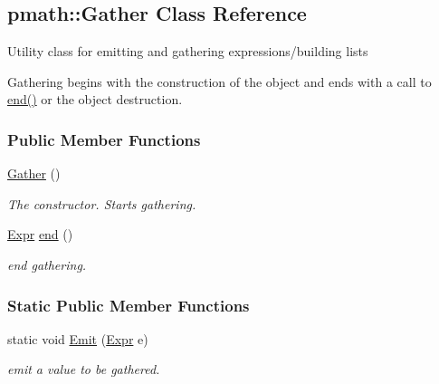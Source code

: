 \hypertarget{classpmath_1_1_gather}{
\subsection{pmath::Gather Class Reference}
\label{classpmath_1_1_gather}
}
Utility class for emitting and gathering expressions/building lists

Gathering begins with the construction of the object and ends with a call to \hyperlink{classpmath_1_1_gather_d686bb5cc8ffc544bff3f7aaa3723061}{end()} or the object destruction.  


\subsubsection*{Public Member Functions}
\begin{CompactItemize}
\item 
\hypertarget{classpmath_1_1_gather_500b90b7db7cf1efd445d450cb184724}{
\hyperlink{classpmath_1_1_gather_500b90b7db7cf1efd445d450cb184724}{Gather} ()}
\label{classpmath_1_1_gather_500b90b7db7cf1efd445d450cb184724}

\begin{CompactList}\small\item\em The constructor. Starts gathering. \item\end{CompactList}\item 
\hypertarget{classpmath_1_1_gather_d686bb5cc8ffc544bff3f7aaa3723061}{
\hyperlink{classpmath_1_1_expr}{Expr} \hyperlink{classpmath_1_1_gather_d686bb5cc8ffc544bff3f7aaa3723061}{end} ()}
\label{classpmath_1_1_gather_d686bb5cc8ffc544bff3f7aaa3723061}

\begin{CompactList}\small\item\em end gathering. \item\end{CompactList}\end{CompactItemize}
\subsubsection*{Static Public Member Functions}
\begin{CompactItemize}
\item 
\hypertarget{classpmath_1_1_gather_a7bde9ff3101ed9e9935617381d508e9}{
static void \hyperlink{classpmath_1_1_gather_a7bde9ff3101ed9e9935617381d508e9}{Emit} (\hyperlink{classpmath_1_1_expr}{Expr} e)}
\label{classpmath_1_1_gather_a7bde9ff3101ed9e9935617381d508e9}

\begin{CompactList}\small\item\em emit a value to be gathered. \item\end{CompactList}\end{CompactItemize}


